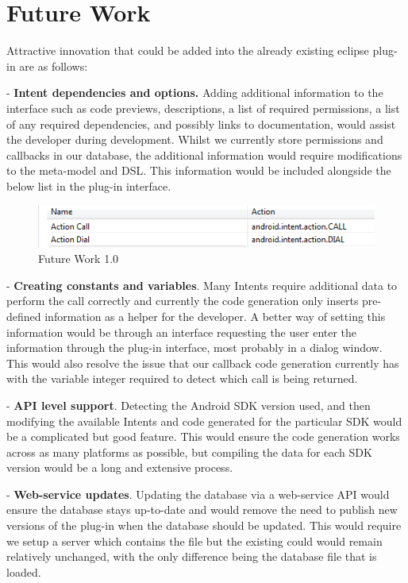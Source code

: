 \section{Future Work}
\label{futurework}

Attractive innovation that could be added into the already existing eclipse plug-in are as follows:

- \textbf{Intent dependencies and options.} Adding additional information to the interface such as code previews, descriptions, a list of required permissions, a list of any required dependencies, and possibly links to documentation, would assist the developer during development. Whilst we currently store permissions and callbacks in our database, the additional information would require modifications to the meta-model and DSL. This information would be included alongside the below list in the plug-in interface.

\begin{figure}[H]
\label{codegeneratorview}
  \centering
    \includegraphics[width=\textwidth]{intentBefore}
  \caption{Future Work 1.0}
\end{figure}

- \textbf{Creating constants and variables}. Many Intents require additional data to perform the call correctly and currently the code generation only inserts pre-defined information as a helper for the developer. A better way of setting this information would be through an interface requesting the user enter the information through the plug-in interface, most probably in a dialog window. This would also resolve the issue that our callback code generation currently has with the variable integer required to detect which call is being returned.

- \textbf{API level support}. Detecting the Android SDK version used, and then modifying the available Intents and code generated for the particular SDK would be a complicated but good feature. This would ensure the code generation works across as many platforms as possible, but compiling the data for each SDK version would be a long and extensive process.

- \textbf{Web-service updates}. Updating the database via a web-service API would ensure the database stays up-to-date and would remove the need to publish new versions of the plug-in when the database should be updated. This would require we setup a server which contains the file but the existing could would remain relatively unchanged, with the only difference being the database file that is loaded.
	